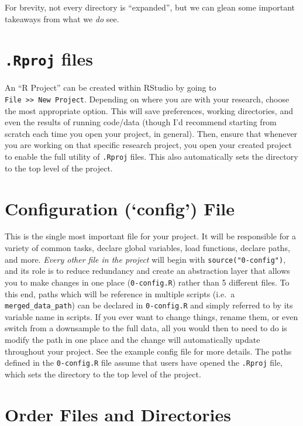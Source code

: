 \documentclass[
]{book}
\begin{document}
For brevity, not every directory is ``expanded'', but we can glean some important takeaways from what we \emph{do} see.

\section{\texorpdfstring{\texttt{.Rproj} files}{.Rproj files}}\label{rproj-files}

An ``R Project'' can be created within RStudio by going to \texttt{File\ \textgreater{}\textgreater{}\ New\ Project}. Depending on where you are with your research, choose the most appropriate option. This will save preferences, working directories, and even the results of running code/data (though I'd recommend starting from scratch each time you open your project, in general). Then, ensure that whenever you are working on that specific research project, you open your created project to enable the full utility of \texttt{.Rproj} files. This also automatically sets the directory to the top level of the project.

\section{Configuration (`config') File}\label{configuration-config-file}

This is the single most important file for your project. It will be responsible for a variety of common tasks, declare global variables, load functions, declare paths, and more. \emph{Every other file in the project} will begin with \texttt{source("0-config")}, and its role is to reduce redundancy and create an abstraction layer that allows you to make changes in one place (\texttt{0-config.R}) rather than 5 different files. To this end, paths which will be reference in multiple scripts (i.e.~a \texttt{merged\_data\_path}) can be declared in \texttt{0-config.R} and simply referred to by its variable name in scripts. If you ever want to change things, rename them, or even switch from a downsample to the full data, all you would then to need to do is modify the path in one place and the change will automatically update throughout your project. See the example config file for more details. The paths defined in the \texttt{0-config.R} file assume that users have opened the \texttt{.Rproj} file, which sets the directory to the top level of the project.

\section{Order Files and Directories}\label{order-files-and-directories}
\end{document}
